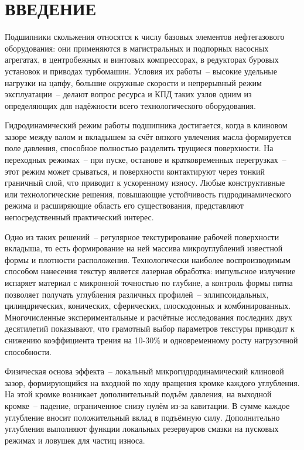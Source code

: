 \section*{ВВЕДЕНИЕ}

Подшипники скольжения относятся к числу базовых элементов нефтегазового оборудования: они применяются в магистральных и подпорных насосных агрегатах, в центробежных и винтовых компрессорах, в редукторах буровых установок и приводах турбомашин. Условия их работы~-- высокие удельные нагрузки на цапфу, большие окружные скорости и непрерывный режим эксплуатации~-- делают вопрос ресурса и КПД таких узлов одним из определяющих для надёжности всего технологического оборудования.

Гидродинамический режим работы подшипника достигается, когда в клиновом зазоре между валом и вкладышем за счёт вязкого увлечения масла формируется поле давления, способное полностью разделить трущиеся поверхности. На переходных режимах~-- при пуске, останове и кратковременных перегрузках~-- этот режим может срываться, и поверхности контактируют через тонкий граничный слой, что приводит к ускоренному износу. Любые конструктивные или технологические решения, повышающие устойчивость гидродинамического режима и расширяющие область его существования, представляют непосредственный практический интерес.

Одно из таких решений~-- регулярное текстурирование рабочей поверхности вкладыша, то есть формирование на ней массива микроуглублений известной формы и плотности расположения. Технологически наиболее воспроизводимым способом нанесения текстур является лазерная обработка: импульсное излучение испаряет материал с микронной точностью по глубине, а контроль формы пятна позволяет получать углубления различных профилей~-- эллипсоидальных, цилиндрических, конических, сферических, плоскодонных и комбинированных. Многочисленные экспериментальные и расчётные исследования последних двух десятилетий показывают, что грамотный выбор параметров текстуры приводит к снижению коэффициента трения на 10-30\% и одновременному росту нагрузочной способности.

Физическая основа эффекта~-- локальный микрогидродинамический клиновой зазор, формирующийся на входной по ходу вращения кромке каждого углубления. На этой кромке возникает дополнительный подъём давления, на выходной кромке~-- падение, ограниченное снизу нулём из-за кавитации. В сумме каждое углубление вносит положительный вклад в подъёмную силу. Дополнительно углубления выполняют функции локальных резервуаров смазки на пусковых режимах и ловушек для частиц износа.

